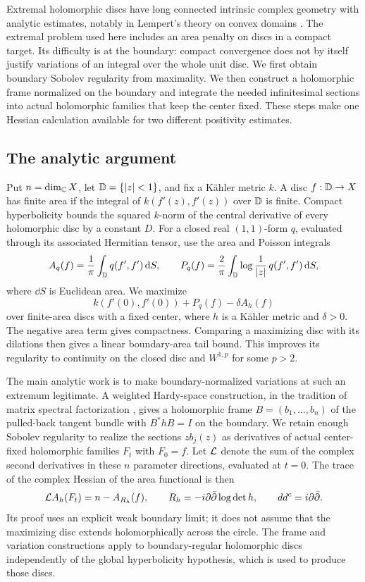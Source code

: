 Extremal holomorphic discs have long connected intrinsic complex
geometry with analytic estimates, notably in Lempert's theory on
convex domains \cite{Lempert1981}. The extremal problem used here
includes an area penalty on discs in a compact target. Its difficulty
is at the boundary: compact convergence does not by itself justify
variations of an integral over the whole unit disc. We first obtain
boundary Sobolev regularity from maximality. We then construct a
holomorphic frame normalized on the boundary and integrate the needed
infinitesimal sections into actual holomorphic families that keep the
center fixed. These steps make one Hessian calculation available for
two different positivity estimates.

\subsection{The analytic argument}

Put $n=\dim_{\mathbb C}X$, let $\mathbb D=\{|z|<1\}$, and fix a K\"ahler metric $k$.
A disc $f:\mathbb D\to X$ has finite area if the integral of
$k(f'(z),f'(z))$ over $\mathbb D$ is finite. Compact hyperbolicity bounds the squared
$k$-norm of the central derivative of every holomorphic disc by a
constant $D$. For a closed
real $(1,1)$-form $q$, evaluated through its associated Hermitian
tensor, use the area and Poisson integrals
\[
 A_q(f)=\frac1\pi\int_\mathbb D q(f',f')\,\mathrm d S,
 \qquad
 P_q(f)=\frac2\pi\int_\mathbb D\log\frac1{|z|}\,q(f',f')\,\mathrm d S,
\]
where $\dd S$ is Euclidean area. We maximize
\[
 k(f'(0),f'(0))+P_q(f)-\delta A_h(f)
\]
over finite-area discs with a fixed center, where $h$ is a K\"ahler
metric and $\delta>0$. The negative area term gives compactness. Comparing
a maximizing disc with its dilations then gives a linear boundary-area
tail bound. This improves its regularity to continuity on the closed
disc and $W^{1,p}$ for some $p>2$.

The main analytic work is to make boundary-normalized variations at
such an extremum legitimate. A weighted Hardy-space construction, in the tradition of matrix
spectral factorization \cite{WienerMasani1957,HelsonLowdenslager1958}, gives
a holomorphic frame $B=(b_1,\ldots,b_n)$ of the pulled-back tangent bundle with
$B^*hB=I$ on the boundary. We retain enough Sobolev regularity to realize
the sections $zb_j(z)$ as derivatives of actual center-fixed
holomorphic families $F_t$ with $F_0=f$. Let $\mathcal L$ denote the sum of
the complex second derivatives in these $n$ parameter directions,
evaluated at $t=0$. The trace of the
complex Hessian of the area functional is then
\[
 \mathcal L A_h(F_t)=n-A_{R_h}(f),
 \qquad R_h=-i\partial\bar\partial\log\det h,
 \qquad dd^c=i\partial\bar\partial.
\]
Its proof uses an explicit weak boundary limit; it does not assume that
the maximizing disc extends holomorphically across the circle. The
frame and variation constructions apply to boundary-regular
holomorphic discs independently of the global hyperbolicity
hypothesis, which is used to produce those discs.

